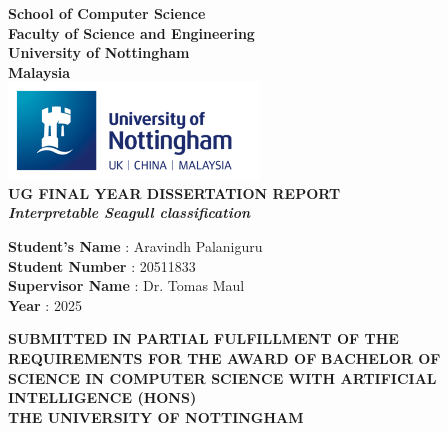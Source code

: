 \documentclass[a4paper,12pt]{report}
\begin{document}
\begin{titlepage}
    \begin{center}

        \textbf{\LARGE{School of Computer Science}}\\[0.5em]
        \textbf{\Large{Faculty of Science and Engineering}}\\[0.5em]
        \textbf{\Large{University of Nottingham}}\\[0.5em]
        \textbf{\Large{Malaysia}}\\[5em]

        \includegraphics[width=0.5\textwidth]{images/nottingham_logo.png}\\[3em]

        \textbf{\Large{UG FINAL YEAR DISSERTATION REPORT}}\\[6em]
        \textbf{\large{\textit{Interpretable Seagull classification}}}\\[6em]

    \end{center}

    \begin{center}
        \begin{minipage}{0.6\textwidth}  %
            \raggedright
            \textbf{Student's Name} \hspace{1.5cm}: Aravindh Palaniguru\\[1em]
            \textbf{Student Number} \hspace{1.4cm}: 20511833\\[1em]
            \textbf{Supervisor Name} \hspace{1.2cm}: Dr. Tomas Maul\\[1em]
            \textbf{Year} \hspace{3.8cm}: 2025\\[4em]
        \end{minipage}
    \end{center}

    \vfill

    \begin{center}
        \begin{minipage}{\textwidth}
            \centering
            {\fontsize{12}{10}\selectfont\textbf{SUBMITTED IN PARTIAL FULFILLMENT OF THE REQUIREMENTS FOR THE AWARD OF}}
            {\fontsize{12}{10}\selectfont\textbf{BACHELOR OF SCIENCE IN COMPUTER SCIENCE WITH ARTIFICIAL INTELLIGENCE (HONS)}}\\
            {\fontsize{12}{10}\selectfont\textbf{THE UNIVERSITY OF NOTTINGHAM}}
        \end{minipage}
    \end{center}
\end{titlepage}
\end{document}
